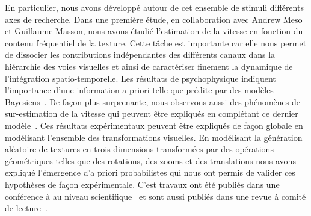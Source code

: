 En particulier, nous avons développé autour de cet ensemble de stimuli différents axes de recherche. Dans une première étude, en collaboration avec Andrew Meso et Guillaume Masson, nous avons étudié l'estimation de la vitesse en fonction du contenu fréquentiel de la texture. Cette tâche est importante car elle nous permet de dissocier les contributions indépendantes des différents canaux dans la hiérarchie des voies visuelles et ainsi de caractériser finement la dynamique de l'intégration spatio-temporelle. Les résultats de psychophysique indiquent l'importance d'une information a priori telle que prédite par des modèles Bayesiens~\citep{Stocker06}. De façon plus surprenante, nous observons aussi des phénomènes de sur-estimation de la vitesse qui peuvent être expliqués en complétant ce dernier modèle~\citep{Meso13vss,Meso14vss,Vacher15nips}. Ces résultats expérimentaux peuvent être expliqués de façon globale en modélisant l'ensemble des transformations visuelles.
En modélisant la génération aléatoire de  textures en trois dimensions transformées par des opérations géométriques telles que des rotations, des zooms et des translations nous avons expliqué l'émergence d'a priori probabilistes qui nous ont permis de valider ces hypothèses de façon expérimentale. C'est travaux ont été publiés dans une conférence à au niveau scientifique~\citep{Vacher15nips} et sont aussi publiés dans une revue à comité de lecture~\citep{Vacher16}.


